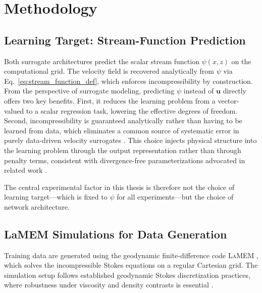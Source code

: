\chapter{Methodology}
\label{ch:methodology}

\section{Learning Target: Stream-Function Prediction}
\label{sec:learning_target}

Both surrogate architectures predict the scalar stream function $\psi(x,z)$ on the computational grid. The velocity field is recovered analytically from $\psi$ via Eq.~\ref{eq:stream_function_def}, which enforces incompressibility by construction. From the perspective of surrogate modeling, predicting $\psi$ instead of $\mathbf{u}$ directly offers two key benefits. First, it reduces the learning problem from a vector-valued to a scalar regression task, lowering the
effective degrees of freedom. Second, incompressibility is guaranteed analytically rather than having to be learned from data, which eliminates a common source of systematic error in purely data-driven velocity surrogates
\parencite{ribeiro_deepcfd_nodate,thuerey_deep_2020}. This choice injects physical structure into the learning problem through the output representation rather than through penalty terms, consistent with divergence-free parameterizations advocated in related work \parencite{richter-powell_neural_2022}.

The central experimental factor in this thesis is therefore not the choice of learning target—which is fixed to $\psi$ for all experiments—but the choice of network architecture.

\section{LaMEM Simulations for Data Generation}
\label{sec:lamem_generation}

Training data are generated using the geodynamic finite-difference code \textsc{LaMEM} \parencite{Popov2013LaMEM}, which solves the incompressible Stokes equations on a regular Cartesian grid. The simulation setup follows established geodynamic Stokes
discretization practices, where robustness under viscosity and density contrasts is essential \parencite{thieulot_choice_2022}.  

